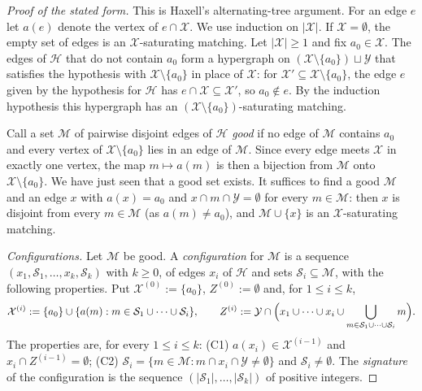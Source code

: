 \begin{proof}[Proof of the stated form]
This is Haxell's alternating-tree argument. For an edge $e$ let $a(e)$ denote
the vertex of $e\cap\mathcal X$. We use induction on $|\mathcal X|$. If
$\mathcal X=\emptyset$, the empty set of edges is an $\mathcal X$-saturating
matching. Let $|\mathcal X|\ge1$ and fix $a_0\in\mathcal X$. The edges of
$\mathcal H$ that do not contain $a_0$ form a hypergraph on
$(\mathcal X\setminus\{a_0\})\sqcup\mathcal Y$ that satisfies the hypothesis
with $\mathcal X\setminus\{a_0\}$ in place of $\mathcal X$: for
$\mathcal X'\subseteq\mathcal X\setminus\{a_0\}$, the edge $e$ given by the
hypothesis for $\mathcal H$ has $e\cap\mathcal X\subseteq\mathcal X'$, so
$a_0\notin e$. By the induction hypothesis this hypergraph has an
$(\mathcal X\setminus\{a_0\})$-saturating matching.

Call a set $\mathcal M$ of pairwise disjoint edges of $\mathcal H$ \emph{good} if
no edge of $\mathcal M$ contains $a_0$ and every vertex of
$\mathcal X\setminus\{a_0\}$ lies in an edge of $\mathcal M$. Since every edge
meets $\mathcal X$ in exactly one vertex, the map $m\mapsto a(m)$ is then a
bijection from $\mathcal M$ onto $\mathcal X\setminus\{a_0\}$. We have just seen
that a good set exists. It suffices to find a good $\mathcal M$ and an edge $x$
with $a(x)=a_0$ and $x\cap m\cap\mathcal Y=\emptyset$ for every
$m\in\mathcal M$: then $x$ is disjoint from every $m\in\mathcal M$ (as
$a(m)\ne a_0$), and $\mathcal M\cup\{x\}$ is an $\mathcal X$-saturating
matching.

\emph{Configurations.} Let $\mathcal M$ be good. A \emph{configuration} for
$\mathcal M$ is a sequence $(x_1,\mathcal S_1,\dots,x_k,\mathcal S_k)$ with
$k\ge0$, of edges $x_i$ of $\mathcal H$ and sets
$\mathcal S_i\subseteq\mathcal M$, with the following properties. Put
$\mathcal X^{(0)}:=\{a_0\}$, $Z^{(0)}:=\emptyset$ and, for $1\le i\le k$,
\[
\mathcal X^{(i)}:=\{a_0\}\cup\{a(m):m\in\mathcal S_1\cup\dots\cup\mathcal S_i\},
\qquad
Z^{(i)}:=\mathcal Y\cap\Bigl(x_1\cup\dots\cup x_i\cup
\bigcup_{m\in\mathcal S_1\cup\dots\cup\mathcal S_i}m\Bigr).
\]
The properties are, for every $1\le i\le k$: (C1) $a(x_i)\in\mathcal X^{(i-1)}$ and
$x_i\cap Z^{(i-1)}=\emptyset$; (C2)
$\mathcal S_i=\{m\in\mathcal M:m\cap x_i\cap\mathcal Y\ne\emptyset\}$ and
$\mathcal S_i\ne\emptyset$. The \emph{signature} of the configuration is the
sequence $(|\mathcal S_1|,\dots,|\mathcal S_k|)$ of positive integers.


\end{proof}
